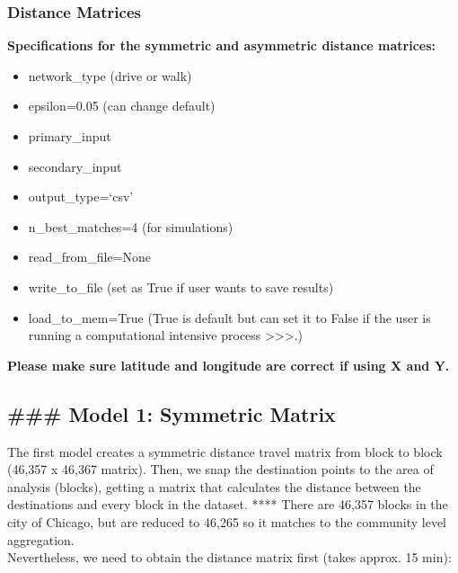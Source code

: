 \documentclass[11pt]{article}
\providecommand{\tightlist}{%
      \setlength{\itemsep}{0pt}\setlength{\parskip}{0pt}}
\begin{document}
    \hypertarget{distance-matrices}{%
\subsubsection{Distance Matrices}\label{distance-matrices}}

 \textbf{Specifications for the symmetric and asymmetric distance
matrices:}

\begin{itemize}
\tightlist
\item
  network\_type (drive or walk)
\item
  epsilon=0.05 (can change default)\\
\item
  primary\_input\\
\item
  secondary\_input\\
\item
  output\_type=`csv'\\
\item
  n\_best\_matches=4 (for simulations)
\item
  read\_from\_file=None\\
\item
  write\_to\_file (set as True if user wants to save results)\\
\item
  load\_to\_mem=True (True is default but can set it to False if the
  user is running a computational intensive process
  \textgreater{}\textgreater{}\textgreater{}.)
\end{itemize}

\textbf{Please make sure latitude and longitude are correct if using X
and Y.}

\hypertarget{model-1-symmetric-matrix}{%
\subsection{\#\#\# Model 1: Symmetric
Matrix}\label{model-1-symmetric-matrix}}

The first model creates a symmetric distance travel matrix from block to
block (46,357 x 46,367 matrix). Then, we snap the destination points to
the area of analysis (blocks), getting a matrix that calculates the
distance between the destinations and every block in the dataset. ****
There are 46,357 blocks in the city of Chicago, but are reduced to
46,265 so it matches to the community level aggregation.\\
Nevertheless, we need to obtain the distance matrix first (takes approx.
15 min):
\end{document}
